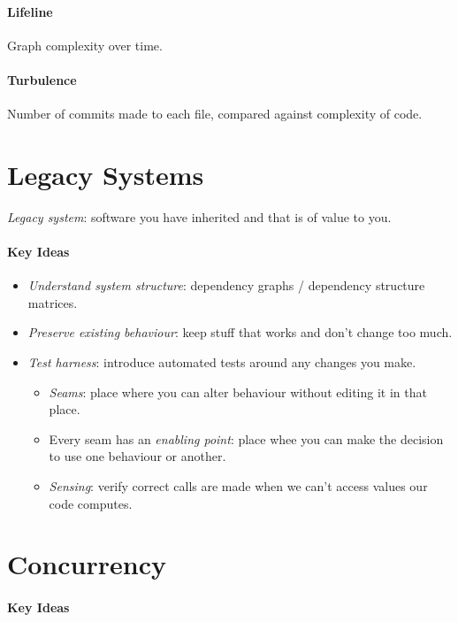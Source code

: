 \documentclass[twocolumn,english]{article}
\begin{document}
\paragraph{Lifeline}

Graph complexity over time.

\paragraph{Turbulence}

Number of commits made to each file, compared against complexity of
code.

\section{Legacy Systems}

\emph{Legacy system}: software you have inherited and that is of value
to you.

\paragraph{Key Ideas}
\begin{itemize}
\item \emph{Understand system structure}: dependency graphs / dependency
structure matrices.
\item \emph{Preserve existing behaviour}: keep stuff that works and don't
change too much.
\item \emph{Test harness}: introduce automated tests around any changes
you make.
\begin{itemize}
\item \emph{Seams}: place where you can alter behaviour without editing
it in that place.
\item Every seam has an \emph{enabling point}: place whee you can make the
decision to use one behaviour or another.
\item \emph{Sensing}: verify correct calls are made when we can't access
values our code computes.
\end{itemize}
\end{itemize}

\section{Concurrency}

\paragraph{Key Ideas}
\end{document}
